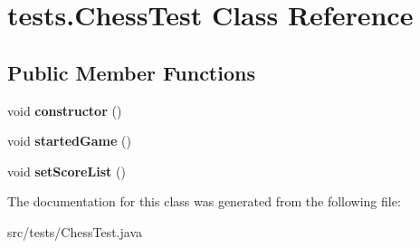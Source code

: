 \hypertarget{classtests_1_1_chess_test}{\section{tests.\-Chess\-Test Class Reference}
\label{classtests_1_1_chess_test}
}
\subsection*{Public Member Functions}
\begin{DoxyCompactItemize}
\item 
\hypertarget{classtests_1_1_chess_test_a8e30303a7b136b945d5662d4b43e3085}{void {\bfseries constructor} ()}\label{classtests_1_1_chess_test_a8e30303a7b136b945d5662d4b43e3085}

\item 
\hypertarget{classtests_1_1_chess_test_ae8dcd4c2307c9a7a4dc63d04aa0a2109}{void {\bfseries started\-Game} ()}\label{classtests_1_1_chess_test_ae8dcd4c2307c9a7a4dc63d04aa0a2109}

\item 
\hypertarget{classtests_1_1_chess_test_ab3744ad462da559996d82eff3bfbaf25}{void {\bfseries set\-Score\-List} ()}\label{classtests_1_1_chess_test_ab3744ad462da559996d82eff3bfbaf25}

\end{DoxyCompactItemize}


The documentation for this class was generated from the following file\-:\begin{DoxyCompactItemize}
\item 
src/tests/Chess\-Test.\-java\end{DoxyCompactItemize}
